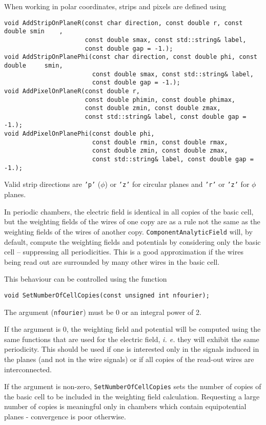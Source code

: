 When working in polar coordinates, strips and pixels are defined using
\begin{lstlisting}
void AddStripOnPlaneR(const char direction, const double r, const double smin    ,
                      const double smax, const std::string& label,
                      const double gap = -1.);
void AddStripOnPlanePhi(const char direction, const double phi, const double     smin,
                        const double smax, const std::string& label,
                        const double gap = -1.);
void AddPixelOnPlaneR(const double r,
                      const double phimin, const double phimax,
                      const double zmin, const double zmax,
                      const std::string& label, const double gap = -1.);
void AddPixelOnPlanePhi(const double phi,
                        const double rmin, const double rmax,
                        const double zmin, const double zmax,
                        const std::string& label, const double gap = -1.);
\end{lstlisting} 
Valid strip directions are \texttt{'p'} ($\phi$) or \texttt{'z'} for 
circular planes and \texttt{'r'} or \texttt{'z'} for $\phi$ planes.

In periodic chambers, the electric field is identical in all copies of the 
basic cell, but the weighting fields of the wires of one copy are as a rule 
not the same as the weighting fields of the wires of another copy.
\texttt{ComponentAnalyticField} will, by default, compute the 
weighting fields and potentials by considering only the basic cell -- 
suppressing all periodicities. This is a good approximation if the wires 
being read out are surrounded by many other wires in the basic cell.

This behaviour can be controlled using the function
\begin{lstlisting}
void SetNumberOfCellCopies(const unsigned int nfourier);
\end{lstlisting}
The argument (\texttt{nfourier}) must be 0 or an integral power of 2.

If the argument is 0,
the weighting field and potential will be computed using the same 
functions that are used for the electric field, \textit{i. e.} they 
will exhibit the same periodicity. 
This should be used if one is interested only in the signals induced in 
the planes (and not in the wire signals) or 
if all copies of the read-out wires are interconnected. 

If the argument is non-zero, \texttt{SetNumberOfCellCopies} 
sets the number of copies of the basic cell to be included in the 
weighting field calculation. 
Requesting a large number of copies is meaningful only in chambers 
which contain equipotential planes - convergence is poor otherwise.

